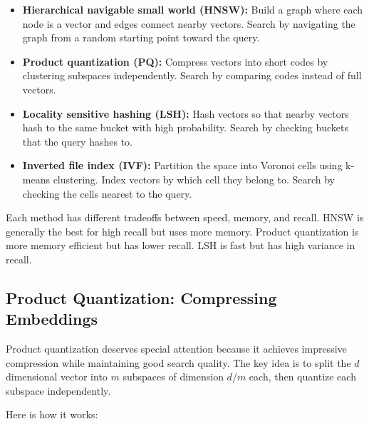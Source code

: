 \begin{itemize}
\item \textbf{Hierarchical navigable small world (HNSW):} Build a graph where each node is a vector and edges connect nearby vectors. Search by navigating the graph from a random starting point toward the query.

\item \textbf{Product quantization (PQ):} Compress vectors into short codes by clustering subspaces independently. Search by comparing codes instead of full vectors.

\item \textbf{Locality sensitive hashing (LSH):} Hash vectors so that nearby vectors hash to the same bucket with high probability. Search by checking buckets that the query hashes to.

\item \textbf{Inverted file index (IVF):} Partition the space into Voronoi cells using k-means clustering. Index vectors by which cell they belong to. Search by checking the cells nearest to the query.
\end{itemize}

\vspace{1em}

Each method has different tradeoffs between speed, memory, and recall. HNSW is generally the best for high recall but uses more memory. Product quantization is more memory efficient but has lower recall. LSH is fast but has high variance in recall.

\vspace{1.5em}

\subsection{Product Quantization: Compressing Embeddings}

Product quantization deserves special attention because it achieves impressive compression while maintaining good search quality. The key idea is to split the $d$ dimensional vector into $m$ subspaces of dimension $d/m$ each, then quantize each subspace independently.

\vspace{1em}

Here is how it works:

